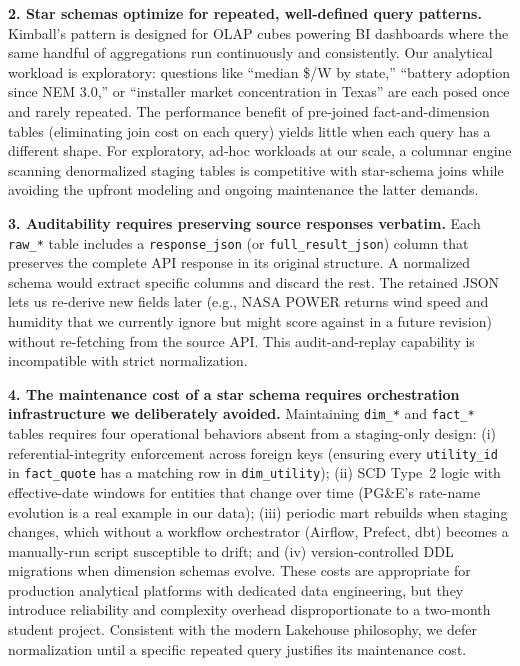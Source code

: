 \documentclass[10pt, conference]{IEEEtran}
\begin{document}
\textbf{2. Star schemas optimize for repeated, well-defined query patterns.}
Kimball's pattern is designed for OLAP cubes powering BI dashboards
where the same handful of aggregations run continuously and consistently.
Our analytical workload is exploratory: questions like ``median \$/W by
state,'' ``battery adoption since NEM 3.0,'' or ``installer market
concentration in Texas'' are each posed once and rarely repeated. The
performance benefit of pre-joined fact-and-dimension tables (eliminating
join cost on each query) yields little when each query has a different
shape. For exploratory, ad-hoc workloads at our scale, a columnar engine
scanning denormalized staging tables is competitive with star-schema
joins while avoiding the upfront modeling and ongoing maintenance the
latter demands.

\textbf{3. Auditability requires preserving source responses verbatim.}
Each \texttt{raw\_*} table includes a \texttt{response\_json} (or
\texttt{full\_result\_json}) column that preserves the complete API
response in its original structure. A normalized schema would extract
specific columns and discard the rest. The retained JSON lets us
re-derive new fields later (e.g., NASA POWER returns wind speed and
humidity that we currently ignore but might score against in a future
revision) without re-fetching from the source API. This audit-and-replay
capability is incompatible with strict normalization.

\textbf{4. The maintenance cost of a star schema requires orchestration
infrastructure we deliberately avoided.} Maintaining
\texttt{dim\_*} and \texttt{fact\_*} tables requires four operational
behaviors absent from a staging-only design: (i) referential-integrity
enforcement across foreign keys (ensuring every \texttt{utility\_id} in
\texttt{fact\_quote} has a matching row in \texttt{dim\_utility});
(ii) SCD Type~2 logic with effective-date windows for entities that
change over time (PG\&E's rate-name evolution is a real example in our
data); (iii) periodic mart rebuilds when staging changes, which without
a workflow orchestrator (Airflow, Prefect, dbt) becomes a manually-run
script susceptible to drift; and (iv) version-controlled DDL migrations
when dimension schemas evolve. These costs are appropriate for
production analytical platforms with dedicated data engineering, but
they introduce reliability and complexity overhead disproportionate
to a two-month student project. Consistent with the modern Lakehouse
philosophy, we defer normalization until a specific repeated query
justifies its maintenance cost.
\end{document}
